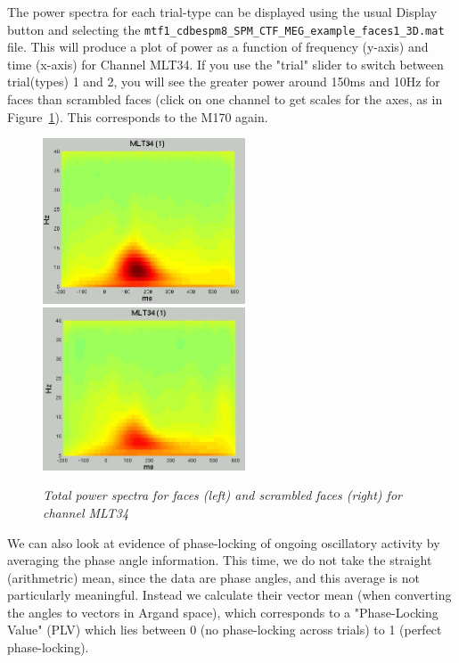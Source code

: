 The power spectra for each trial-type can be displayed using the usual Display button and selecting the \verb!mtf1_cdbespm8_SPM_CTF_MEG_example_faces1_3D.mat! file. This will produce a plot of power as a function of frequency (y-axis) and time (x-axis) for Channel MLT34. If you use the "trial" slider to switch between trial(types) 1 and 2, you will see the greater power around 150ms and 10Hz for faces than scrambled faces (click on one channel to get scales for the axes, as in Figure~\ref{fig_32_13}). This corresponds to the M170 again.


\begin{figure}
\begin{center}
\includegraphics[width=60mm]{multimodal/figures/figure_32_13_L}
\includegraphics[width=60mm]{multimodal/figures/figure_32_13_R}
\caption{\em  Total power spectra for faces (left) and scrambled faces (right) for channel MLT34\label{fig_32_13}}
\end{center}
\end{figure}

We can also look at evidence of phase-locking of ongoing oscillatory activity by averaging the phase angle information. This time, we do not take the straight (arithmetric) mean, since the data are phase angles, and this average is not particularly meaningful. Instead we calculate their vector mean (when converting the angles to vectors in Argand space), which corresponds to a "Phase-Locking Value" (PLV) which lies between 0 (no phase-locking across trials) to 1 (perfect phase-locking).


